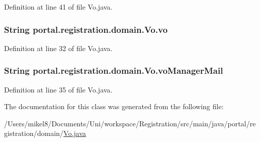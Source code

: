 Definition at line 41 of file Vo.java.

\hypertarget{classportal_1_1registration_1_1domain_1_1Vo_a1c5498821ecbdd3d80d5dce3f26a907e}{
\subsubsection[{vo}]{\setlength{\rightskip}{0pt plus 5cm}String {\bf portal.registration.domain.Vo.vo}}}
\label{classportal_1_1registration_1_1domain_1_1Vo_a1c5498821ecbdd3d80d5dce3f26a907e}


Definition at line 32 of file Vo.java.

\hypertarget{classportal_1_1registration_1_1domain_1_1Vo_a40f905eb8ab449d765fd1bcb7488a876}{
\subsubsection[{voManagerMail}]{\setlength{\rightskip}{0pt plus 5cm}String {\bf portal.registration.domain.Vo.voManagerMail}}}
\label{classportal_1_1registration_1_1domain_1_1Vo_a40f905eb8ab449d765fd1bcb7488a876}


Definition at line 35 of file Vo.java.



The documentation for this class was generated from the following file:\begin{DoxyCompactItemize}
\item 
/Users/mikel8/Documents/Uni/workspace/Registration/src/main/java/portal/registration/domain/\hyperlink{Vo_8java}{Vo.java}\end{DoxyCompactItemize}
